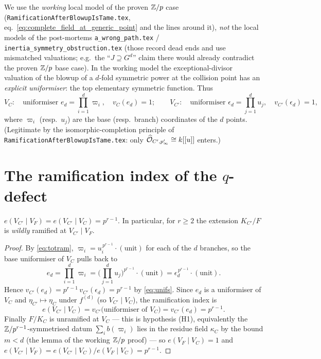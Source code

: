 \documentclass[11pt]{article}
\begin{document}
We use the \emph{working} local model of the proven $\mathbb{Z}/p$ case
(\texttt{RamificationAfterBlowupIsTame.tex}, eq.~\cref{eq:complete_field_at_generic_point}
and the lines around it), \emph{not} the local models of the post-mortems
\texttt{a\_wrong\_path.tex} / \texttt{inertia\_symmetry\_obstruction.tex} (those
record dead ends and use mismatched valuations; e.g.\ the ``$J\supseteq G^d$''
claim there would already contradict the proven $\mathbb{Z}/p$ base case). In the
working model the exceptional-divisor valuation of the blowup of a $d$-fold
symmetric power at the collision point has an \emph{explicit uniformiser}: the
top elementary symmetric function. Thus
\begin{equation}\label{eq:unifs}
V_C:\quad \text{uniformiser } e_d=\textstyle\prod_{i=1}^d \varpi_i,\quad v_C(e_d)=1;
\qquad
V_{C'}:\quad \text{uniformiser } \epsilon_d=\textstyle\prod_{j=1}^d u_j,\quad v_{C'}(\epsilon_d)=1,
\end{equation}
where $\varpi_i$ (resp.\ $u_j$) are the base (resp.\ branch) coordinates of the
$d$ points. (Legitimate by the isomorphic-completion principle of
\texttt{RamificationAfterBlowupIsTame.tex}: only
$\widehat{\mathcal{O}}_{C',p'_\infty}\cong k[[u]]$ enters.)

\section{The ramification index of the \texorpdfstring{$q$}{q}-defect}\label{sec:index}

\begin{theorem}\label{thm:index}
$e(V_{C'}\mid V_F)=e(V_{C'}\mid V_C)=p^{r-1}$. In particular, for $r\ge2$ the
extension $K_{C'}/F$ is \emph{wildly} ramified at $V_{C'}\mid V_F$.
\end{theorem}

\begin{proof}
By \cref{eq:totram}, $\varpi_i=u_i^{\,p^{r-1}}\cdot(\text{unit})$ for each of the
$d$ branches, so the base uniformiser of $V_C$ pulls back to
\[
e_d=\prod_{i=1}^d\varpi_i
   =\Big(\prod_{j=1}^d u_j\Big)^{\!p^{r-1}}\!\!\cdot(\text{unit})
   =\epsilon_d^{\,p^{r-1}}\cdot(\text{unit}).
\]
Hence $v_{C'}(e_d)=p^{r-1}\,v_{C'}(\epsilon_d)=p^{r-1}$ by \cref{eq:unifs}.
Since $e_d$ is a uniformiser of $V_C$ and $\eta_{C'}\mapsto\eta_C$ under
$f^{(d)}$ (so $V_{C'}\mid V_C$), the ramification index is
\[
e(V_{C'}\mid V_C)=v_{C'}\big(\text{uniformiser of }V_C\big)=v_{C'}(e_d)=p^{r-1}.
\]
Finally $F/K_C$ is unramified at $V_C$ --- this is hypothesis (H1), equivalently
the $\mathbb{Z}/p^{r-1}$-symmetrised datum $\sum_i b(\varpi_i)$ lies in the residue field
$\kappa_C$ by the bound $m<d$ (the lemma of the working $\mathbb{Z}/p$ proof) --- so
$e(V_F\mid V_C)=1$ and
$e(V_{C'}\mid V_F)=e(V_{C'}\mid V_C)/e(V_F\mid V_C)=p^{r-1}$.
\end{proof}
\end{document}
